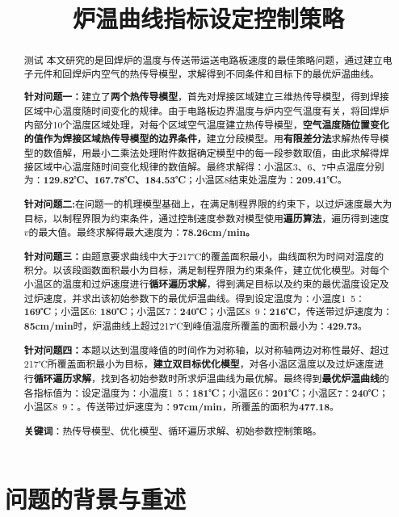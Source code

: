 \documentclass[withoutpreface,bwprint]{cumcmthesis} %
\title{炉温曲线指标设定控制策略}
\numberwithin{equation}{subsection}
\begin{document}
 \maketitle
 \begin{abstract}
测试
本文研究的是回焊炉的温度与传送带运送电路板速度的最佳策略问题，通过建立电子元件和回焊炉内空气的热传导模型，求解得到不同条件和目标下的最优炉温曲线。

\textbf{针对问题一：}建立了\textbf{两个热传导模型}，首先对焊接区域建立三维热传导模型，得到焊接区域中心温度随时间变化的规律。由于电路板边界温度与炉内空气温度有关，将回焊炉内部分10个温度区域处理，对每个区域空气温度建立热传导模型，\textbf{空气温度随位置变化的值作为焊接区域热传导模型的边界条件，}建立分段模型。用\textbf{有限差分法}求解热传导模型的数值解，用最小二乘法处理附件数据确定模型中的每一段参数取值，由此求解得焊接区域中心温度随时间变化规律的数值解。最终求解得：小温区3、6、7中点温度分别为：\textbf{129.82℃、167.78℃、184.53℃}；小温区8结束处温度为：\textbf{209.41℃}。

\textbf{针对问题二:}在问题一的机理模型基础上，在满足制程界限的约束下，以过炉速度最大为目标，以制程界限为约束条件，通过控制速度参数对模型使用\textbf{遍历算法}，遍历得到速度$v$的最大值。最终求解得最大速度为：\textbf{78.26cm/min。}

\textbf{针对问题三：}由题意要求曲线中大于217℃的覆盖面积最小，曲线面积为时间对温度的积分。以该段函数面积最小为目标，满足制程界限为约束条件，建立优化模型。对每个小温区的温度和过炉速度进行\textbf{循环遍历求解}，得到满足目标以及约束的最优温度设定及过炉速度，并求出该初始参数下的最优炉温曲线。得到设定温度为：小温度1~5：\textbf{169℃}；小温区6: \textbf{180℃}；小温区7：\textbf{240℃}；小温区8~9：\textbf{216℃}，传送带过炉速度为：\textbf{85cm/min}时，炉温曲线上超过217℃到峰值温度所覆盖的面积最小为：\textbf{429.73}。

\textbf{针对问题四：}本题以达到温度峰值的时间作为对称轴，以对称轴两边对称性最好、超过217℃所覆盖面积最小为目标，\textbf{建立双目标优化模型}，对各小温区温度以及过炉速度进行\textbf{循环遍历求解}，找到各初始参数时所求炉温曲线为最优解。最终得到\textbf{最优炉温曲线}的各指标值为：设定温度为：小温度1~5：\textbf{181℃}；小温区6：\textbf{201℃}；小温区7：\textbf{240℃}；小温区8~9：。传送带过炉速度为：\textbf{97cm/min}，所覆盖的面积为\textbf{477.18}。

\textbf{关键词}：热传导模型、优化模型、循环遍历求解、初始参数控制策略。
\end{abstract}





\section{问题的背景与重述}
\end{document}
